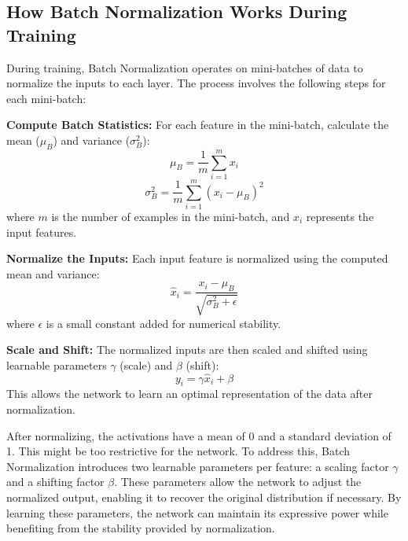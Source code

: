 \subsection{How Batch Normalization Works During Training}
During training, Batch Normalization operates on mini-batches of data to normalize the inputs to each layer. The process involves the following steps for each mini-batch:
\begin{compactitemize}
    \item \textbf{Compute Batch Statistics:} For each feature in the mini-batch, calculate the mean (\(\mu_B\)) and variance (\(\sigma_B^2\)):
    \[
    \mu_B = \frac{1}{m} \sum_{i=1}^{m} x_i
    \]
    \[
    \sigma_B^2 = \frac{1}{m} \sum_{i=1}^{m} (x_i - \mu_B)^2
    \]
    where \(m\) is the number of examples in the mini-batch, and \(x_i\) represents the input features.
    \item \textbf{Normalize the Inputs:} Each input feature is normalized using the computed mean and variance:
    \[
    \hat{x}_i = \frac{x_i - \mu_B}{\sqrt{\sigma_B^2 + \epsilon}}
    \]
    where \(\epsilon\) is a small constant added for numerical stability.
    \item \textbf{Scale and Shift:} The normalized inputs are then scaled and shifted using learnable parameters \(\gamma\) (scale) and \(\beta\) (shift):
    \[
    y_i = \gamma \hat{x}_i + \beta
    \]
    This allows the network to learn an optimal representation of the data after normalization.
\end{compactitemize}
After normalizing, the activations have a mean of 0 and a standard deviation of 1. This might be too restrictive for the network. To address this, Batch Normalization introduces two learnable parameters per feature: a scaling factor \(\gamma\) and a shifting factor \(\beta\). These parameters allow the network to adjust the normalized output, enabling it to recover the original distribution if necessary. By learning these parameters, the network can maintain its expressive power while benefiting from the stability provided by normalization.

